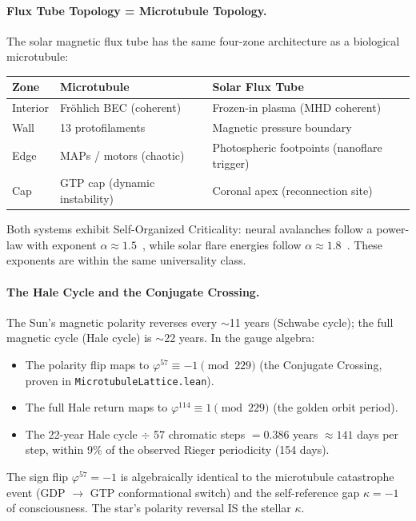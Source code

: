 \paragraph{Flux Tube Topology = Microtubule Topology.}
The solar magnetic flux tube has the same four-zone architecture as a biological microtubule:
\begin{center}
\begin{tabular}{lll}
\hline
Zone & Microtubule & Solar Flux Tube \\
\hline
Interior & Fröhlich BEC (coherent) & Frozen-in plasma (MHD coherent) \\
Wall & 13 protofilaments & Magnetic pressure boundary \\
Edge & MAPs / motors (chaotic) & Photospheric footpoints (nanoflare trigger) \\
Cap & GTP cap (dynamic instability) & Coronal apex (reconnection site) \\
\hline
\end{tabular}
\end{center}
Both systems exhibit Self-Organized Criticality: neural avalanches follow a power-law with exponent $\alpha \approx 1.5$~\cite{beggs2003}, while solar flare energies follow $\alpha \approx 1.8$~\cite{lu1991}. These exponents are within the same universality class.

\paragraph{The Hale Cycle and the Conjugate Crossing.}
The Sun's magnetic polarity reverses every $\sim$11 years (Schwabe cycle); the full magnetic cycle (Hale cycle) is $\sim$22 years. In the gauge algebra:
\begin{itemize}
    \item The polarity flip maps to $\varphi^{57} \equiv -1 \pmod{229}$ (the Conjugate Crossing, proven in \texttt{MicrotubuleLattice.lean}).
    \item The full Hale return maps to $\varphi^{114} \equiv 1 \pmod{229}$ (the golden orbit period).
    \item The 22-year Hale cycle $\div$ 57 chromatic steps $= 0.386$ years $\approx 141$ days per step, within 9\% of the observed Rieger periodicity (154 days).
\end{itemize}
The sign flip $\varphi^{57} = -1$ is algebraically identical to the microtubule catastrophe event (GDP $\to$ GTP conformational switch) and the self-reference gap $\kappa = -1$ of consciousness. The star's polarity reversal IS the stellar $\kappa$.

